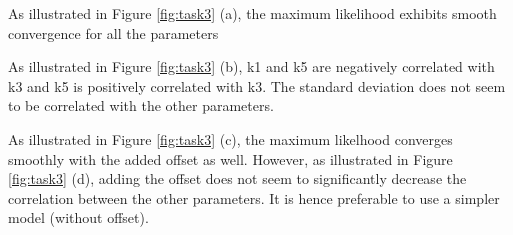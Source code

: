 \documentclass{article}
\begin{document}
    As illustrated in Figure \ref{fig:task3} (a), the maximum likelihood exhibits smooth convergence for all the parameters

    As illustrated in Figure \ref{fig:task3} (b), k1 and k5 are negatively correlated with k3 and k5 is positively correlated with k3. The standard deviation does not seem to be correlated with the other parameters.

    As illustrated in Figure \ref{fig:task3} (c), the maximum likelhood converges smoothly with the added offset as well. However, as illustrated in Figure \ref{fig:task3} (d), adding the offset does not seem to significantly decrease the correlation between the other parameters.
    It is hence preferable to use a simpler model (without offset).
\end{document}
